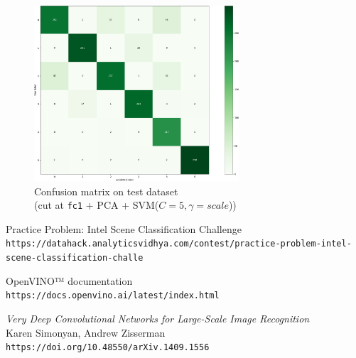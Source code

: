 \documentclass[compsoc]{IEEEtran}
\begin{document}
\begin{figure}[ht!]
\centering                                                                        
\includegraphics[width=3in]{../images/cm1-pca-test.png}
\captionsetup{justification=centering}                                                                                         
\caption{Confusion matrix on test dataset \\ (cut at \texttt{fc1} + PCA + SVM($C=5, \gamma=scale$))}
\label{fig:cm1-pca-test}                                                                                                                               
\end{figure}

























\begin{thebibliography}{9}

Practice Problem: Intel Scene Classification Challenge \\
\texttt{https://datahack.analyticsvidhya.com/contest/practice-problem-intel-scene-classification-challe}

OpenVINO™ documentation \\
\texttt{https://docs.openvino.ai/latest/index.html}

\emph{Very Deep Convolutional Networks for Large-Scale Image Recognition} \\
Karen Simonyan, Andrew Zisserman \\
\texttt{https://doi.org/10.48550/arXiv.1409.1556}

\end{thebibliography}
\end{document}
